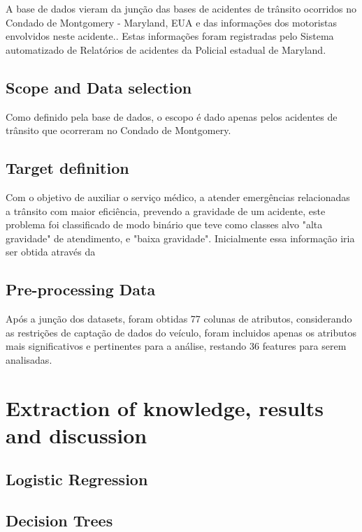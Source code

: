 \documentclass[conference]{IEEEtran}
\begin{document}
A base de dados vieram da junção das bases de acidentes de trânsito\cite{incidents}
ocorridos no Condado de Montgomery - Maryland, EUA e das informações dos motoristas envolvidos neste acidente\cite{drivers}..
Estas informações foram registradas pelo Sistema automatizado de Relatórios de acidentes da Policial estadual de Maryland.  

\subsection{Scope and Data selection}
Como definido pela base de dados, o escopo é dado apenas pelos acidentes de trânsito que ocorreram no Condado de Montgomery. 
\subsection{Target definition}
Com o objetivo de auxiliar o serviço médico, a atender emergências relacionadas a trânsito com maior eficiência,
prevendo a gravidade de um acidente, este problema foi classificado de modo binário que teve como classes alvo 
"alta gravidade" de atendimento, e "baixa gravidade". Inicialmente essa informação iria ser obtida através da 

\subsection{Pre-processing Data}
Após a junção dos datasets, foram obtidas 77 colunas de atributos, considerando as restrições de captação de dados do veículo, 
foram incluidos apenas os atributos mais significativos e pertinentes para a análise, restando 36 features para serem analisadas.

\section{Extraction of knowledge, results and discussion}

\subsection{Logistic Regression}

\subsection{Decision Trees}
\end{document}
